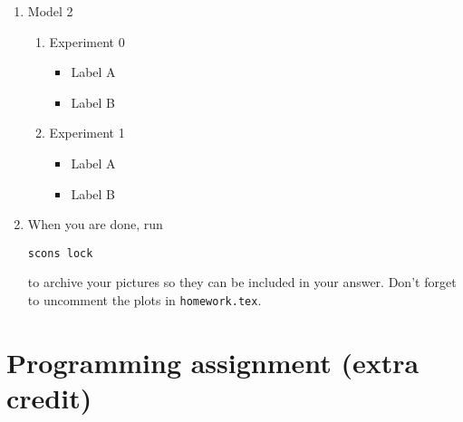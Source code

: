\begin{enumerate}
\begin{enumerate}
      \end{enumerate}

\item Model 2

      \begin{enumerate}

      \item Experiment 0

            \begin{itemize}
	    \item Label A
	    \item Label B
	    \end{itemize}

      \item Experiment 1

            \begin{itemize}
	    \item Label A
	    \item Label B
	    \end{itemize}

      \end{enumerate}

\item When you are done, run
\par \texttt{scons lock}
\par to archive your pictures so they can be included in your answer.
Don't forget to uncomment the plots in \texttt{homework.tex}.

\end{enumerate}




\section{Programming assignment (extra credit)}


